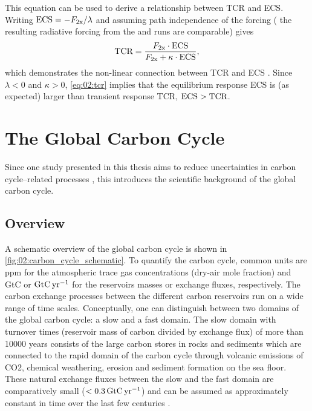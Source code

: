 This equation can be used to derive a relationship between \ac{TCR} and
\ac{ECS}. Writing $\mathtxt{ECS} = -F_\mathtxt{2x} / \lambda$ and assuming path
independence of the forcing (\ie{} the resulting radiative forcing from the
\onepctcotwo{} and  runs are comparable) gives
\begin{equation}
  \mathtxt{TCR} = \frac{F_\mathtxt{2x} \cdot \mathtxt{ECS}}{F_\mathtxt{2x} +
    \kappa \cdot \mathtxt{ECS}},
  \label{eq:02:tcr_vs_ecs}
\end{equation}
which demonstrates the non-linear connection between \ac{TCR} and \ac{ECS}
\autocite{Gregory2008, Nijsse2020}. Since $\lambda < 0$ and $\kappa > 0$,
\cref{eq:02:tcr} implies that the equilibrium response \ac{ECS} is (as
expected) larger than transient response \ac{TCR}, \ie{} $\mathtxt{ECS} >
\mathtxt{TCR}$.


\section{The Global Carbon Cycle}
\label{sec:02:carbon_cycle}

Since one study presented in this thesis aims to reduce uncertainties in carbon
cycle--related processes ,
this  introduces the scientific background of the
global carbon cycle.


\subsection{Overview}
\label{subsec:02:carbon_cycle_overview}

A schematic overview of the global carbon cycle is shown in
\cref{fig:02:carbon_cycle_schematic}. To quantify the carbon cycle, common
units are \ac{ppm} for the atmospheric trace gas concentrations (dry-air mole
fraction) and \ac{GtC} or $\si{\GtCyr{}}$ for the reservoirs masses or exchange
fluxes, respectively. The carbon exchange processes between the different
carbon reservoirs run on a wide range of time scales. Conceptually, one can
distinguish between two domains of the global carbon cycle: a slow and a fast
domain. The slow domain with turnover times (reservoir mass of carbon divided
by exchange flux) of more than 10000 years consists of the large carbon stores
in rocks and sediments which are connected to the rapid domain of the carbon
cycle through volcanic emissions of \ac{CO2}, chemical weathering, erosion and
sediment formation on the sea floor. These natural exchange fluxes between the
slow and the fast domain are comparatively small ($< 0.3 \unit{\GtCyr{}}$) and
can be assumed as approximately constant in time over the last few centuries
\autocite{Ciais2013}.

